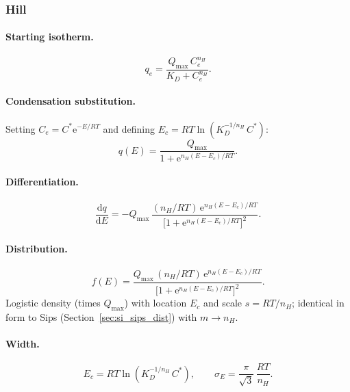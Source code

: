 \documentclass[journal=aamick,manuscript=article]{achemso}
\begin{document}
\subsubsection{Hill}

\paragraph{Starting isotherm.}
\begin{equation}
	q_e = \frac{Q_{\max}\,C_e^{n_H}}{K_D + C_e^{n_H}}.
\end{equation}

\paragraph{Condensation substitution.}
Setting $C_e = C^{\ast}\mathrm{e}^{-E/RT}$ and defining
$E_c = RT\ln(K_D^{-1/n_H}\,C^{\ast})$:
\begin{equation}
	q(E) = \frac{Q_{\max}}{1+\mathrm{e}^{n_H(E-E_c)/RT}}.
\end{equation}

\paragraph{Differentiation.}
\begin{equation}
	\frac{\mathrm{d}q}{\mathrm{d}E}
	= -Q_{\max}\,\frac{(n_H/RT)\,\mathrm{e}^{n_H(E-E_c)/RT}}
	           {\bigl[1+\mathrm{e}^{n_H(E-E_c)/RT}\bigr]^{2}}.
\end{equation}

\paragraph{Distribution.}
\begin{equation}
	f(E) = \frac{Q_{\max}\,(n_H/RT)\,\mathrm{e}^{n_H(E-E_c)/RT}}
	           {\bigl[1+\mathrm{e}^{n_H(E-E_c)/RT}\bigr]^{2}}.
	\label{eq:si_fE_Hill}
\end{equation}
Logistic density (times $Q_{\max}$) with location $E_c$ and scale $s = RT/n_H$;
identical in form to Sips (Section~\ref{sec:si_sips_dist}) with $m \to n_H$.

\paragraph{Width.}
\begin{equation}
	E_c = RT\ln(K_D^{-1/n_H}\,C^{\ast}),
	\qquad
	\sigma_E = \frac{\pi}{\sqrt{3}}\,\frac{RT}{n_H}.
	\label{eq:si_sigmaE_Hill}
\end{equation}
\end{document}

